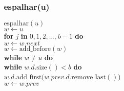 \documentclass{beamer}
\begin{document}
\begin{frame}
\frametitle{espalhar(u)}
\begin{oframed}
\begin{flushleft}
\hspace*{1em} \ensuremath{\mathrm{espalhar}(\ensuremath{\mathit{u}})}\\
\hspace*{1em} \hspace*{1em} \ensuremath{\ensuremath{\mathit{w}} \gets  \ensuremath{u}}\\
\hspace*{1em} \hspace*{1em} {\color{black} \textbf{for}} \ensuremath{j} {\color{black} \textbf{in}} \ensuremath{0,1,2,\ldots,\ensuremath{\mathit{b}}-1} {\color{black} \textbf{do}} \\
\hspace*{1em} \hspace*{1em} \hspace*{1em} \ensuremath{\ensuremath{\mathit{w}} \gets  \ensuremath{\ensuremath{\mathit{w}}.next}}\\
\hspace*{1em} \hspace*{1em} \ensuremath{\ensuremath{\mathit{w}} \gets  \ensuremath{\mathrm{add\_before}(\ensuremath{\mathit{w}})}}\\
\hspace*{1em} \hspace*{1em} {\color{black} \textbf{while}} \ensuremath{\ensuremath{\mathit{w}} \ne u} {\color{black} \textbf{do}} \\
\hspace*{1em} \hspace*{1em} \hspace*{1em} {\color{black} \textbf{while}} \ensuremath{\ensuremath{\mathit{w}}.\ensuremath{\mathit{d}}.\mathrm{size}() < b} {\color{black} \textbf{do}} \\
\hspace*{1em} \hspace*{1em} \hspace*{1em} \hspace*{1em} \ensuremath{\ensuremath{\mathit{w}}.\ensuremath{\mathit{d}}.\mathrm{add\_first}(\ensuremath{\mathit{w}}.\ensuremath{\mathit{prev}}.\ensuremath{\mathit{d}}.\mathrm{remove\_last}()})\\
\hspace*{1em} \hspace*{1em} \hspace*{1em} \ensuremath{\ensuremath{\mathit{w}} \gets  \ensuremath{\ensuremath{\mathit{w}}.prev}}\\
\end{flushleft}
\end{oframed}
\end{frame}
\end{document}
